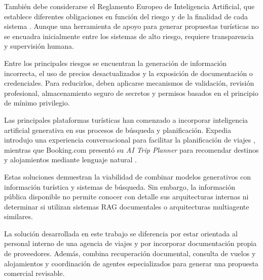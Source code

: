 También debe considerarse el Reglamento Europeo de Inteligencia Artificial, que establece diferentes obligaciones en función del riesgo y de la finalidad de cada sistema \parencite{euai2024act}. Aunque una herramienta de apoyo para generar propuestas turísticas no se encuadra inicialmente entre los sistemas de alto riesgo, requiere transparencia y supervisión humana.

Entre los principales riesgos se encuentran la generación de información incorrecta, el uso de precios desactualizados y la exposición de documentación o credenciales. Para reducirlos, deben aplicarse mecanismos de validación, revisión profesional, almacenamiento seguro de secretos y permisos basados en el principio de mínimo privilegio.

Las principales plataformas turísticas han comenzado a incorporar inteligencia artificial generativa en sus procesos de búsqueda y planificación. Expedia introdujo una experiencia conversacional para facilitar la planificación de viajes \parencite{expedia2023chatgpt}, mientras que Booking.com presentó su \textit{AI Trip Planner} para recomendar destinos y alojamientos mediante lenguaje natural \parencite{booking2023openai}.

Estas soluciones demuestran la viabilidad de combinar modelos generativos con información turística y sistemas de búsqueda. Sin embargo, la información pública disponible no permite conocer con detalle sus arquitecturas internas ni determinar si utilizan sistemas RAG documentales o arquitecturas multiagente similares.

La solución desarrollada en este trabajo se diferencia por estar orientada al personal interno de una agencia de viajes y por incorporar documentación propia de proveedores. Además, combina recuperación documental, consulta de vuelos y alojamientos y coordinación de agentes especializados para generar una propuesta comercial revisable.
